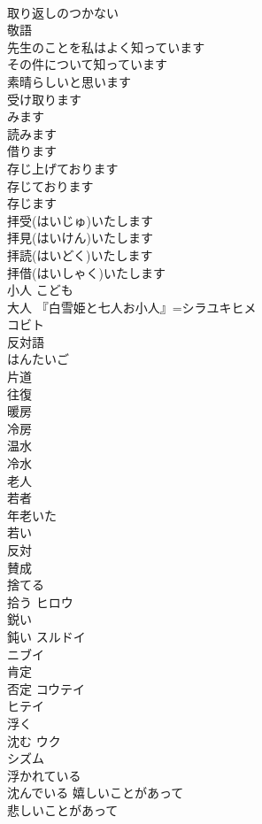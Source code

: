 \documentclass[8pt]{extreport}
\begin{document}
\begin{CJK}{UTF8}{min}
\\	取り返しのつかない	
\\	敬語 
\\	先生のことを私はよく知っています 
\\	その件について知っています 
\\	素晴らしいと思います 
\\	受け取ります 
\\	みます 
\\	読みます 
\\	借ります	
\\	存じ上げております 
\\	存じております 
\\	存じます 
\\	拝受(はいじゅ)いたします 
\\	拝見(はいけん)いたします 
\\	拝読(はいどく)いたします 
\\	拝借(はいしゃく)いたします
\\	小人	こども　
\\	大人 『白雪姫と七人お小人』=シラユキヒメ
\\	コビト
\\	反対語	
\\	はんたいご
\\	片道 
\\	往復	
\\	暖房 
\\	冷房	
\\	温水 
\\	冷水	
\\	老人 
\\	若者	
\\	年老いた 
\\	若い	
\\	反対 
\\	賛成	
\\	捨てる 
\\	拾う	ヒロウ 
\\	鋭い 
\\	鈍い	スルドイ 
\\	ニブイ 
\\	肯定 
\\	否定	コウテイ 
\\	ヒテイ 
\\	浮く 
\\	沈む	ウク 
\\	シズム 
\\	浮かれている 
\\	沈んでいる	嬉しいことがあって 
\\	悲しいことがあって 

\end{CJK}
\end{document}
